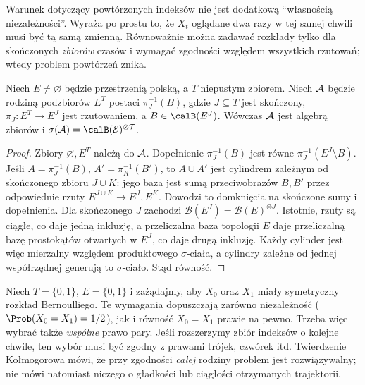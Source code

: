 Warunek dotyczący powtórzonych indeksów nie jest dodatkową
``własnością niezależności''. Wyraża po prostu to, że
$X_t$ oglądane dwa razy w tej samej chwili musi być tą samą
zmienną. Równoważnie można zadawać rozkłady tylko dla
skończonych \emph{zbiorów} czasów i wymagać zgodności
względem wszystkich rzutowań; wtedy problem powtórzeń znika.

\begin{lemat}
Niech $E\ne\varnothing$ będzie przestrzenią polską, a $T$
niepustym zbiorem. Niech $\cal A$ będzie rodziną podzbiorów
$E^T$ postaci $\pi_J^{-1}(B)$, gdzie
$J\subseteq T$ jest skończony, $\pi_J:E^T\to E^J$
jest rzutowaniem, a $B\in\calB(E^J)$.
Wówczas $\cal A$ jest algebrą zbiorów i
$\sigma(\cal A)=\calB(E)^{\otimes T}$.
\end{lemat}
\begin{proof}
Zbiory $\varnothing,E^T$ należą do $\cal A$.
Dopełnienie $\pi_J^{-1}(B)$ jest równe
$\pi_J^{-1}(E^J\setminus B)$. Jeśli
$A=\pi_J^{-1}(B)$, $A'=\pi_K^{-1}(B')$, to
$A\cup A'$ jest cylindrem zależnym od skończonego zbioru
$J\cup K$: jego baza jest sumą przeciwobrazów $B,B'$ przez
odpowiednie rzuty $E^{J\cup K}\to E^J,E^K$.
Dowodzi to domknięcia na skończone sumy i dopełnienia.
Dla skończonego $J$ zachodzi
$\mathcal B(E^J)=\mathcal B(E)^{\otimes J}$.
Istotnie, rzuty są ciągłe, co daje jedną inkluzję,
a przeliczalna baza topologii $E$ daje przeliczalną
bazę prostokątów otwartych w $E^J$, co daje drugą inkluzję.
Każdy cylinder jest więc mierzalny względem produktowego
$\sigma$-ciała, a cylindry zależne od jednej współrzędnej
generują to $\sigma$-ciało. Stąd równość.
\end{proof}


\begin{przyklad}
Niech $T=\{0,1\}$, $E=\{0,1\}$ i zażądajmy, aby
$X_0$ oraz $X_1$ miały symetryczny rozkład Bernoulliego.
Te wymagania dopuszczają zarówno niezależność
($\Prob(X_0=X_1)=1/2$), jak i równość $X_0=X_1$ prawie
na pewno. Trzeba więc wybrać także \emph{wspólne} prawo pary.
Jeśli rozszerzymy zbiór indeksów o kolejne chwile,
ten wybór musi być zgodny z prawami trójek, czwórek itd. Twierdzenie Kołmogorowa mówi, że przy
zgodności \emph{całej} rodziny problem jest rozwiązywalny;
nie mówi natomiast niczego o gładkości lub ciągłości
otrzymanych trajektorii.
\end{przyklad}

